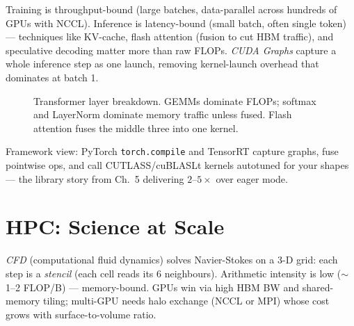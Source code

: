 Training is throughput-bound (large batches, data-parallel across hundreds of GPUs with NCCL). Inference is latency-bound (small batch, often single token) --- techniques like KV-cache, flash attention (fusion to cut HBM traffic), and speculative decoding matter more than raw FLOPs. \emph{CUDA Graphs} capture a whole inference step as one launch, removing kernel-launch overhead that dominates at batch 1.

\begin{figure}[h]\centering
{}
\caption{Transformer layer breakdown. GEMMs dominate FLOPs; softmax and LayerNorm dominate memory traffic unless fused. Flash attention fuses the middle three into one kernel.}
\label{fig:transformer}
\end{figure}

Framework view: PyTorch \texttt{torch.compile} and TensorRT capture graphs, fuse pointwise ops, and call CUTLASS/cuBLASLt kernels autotuned for your shapes --- the library story from Ch.~5 delivering $2$--$5\times$ over eager mode.

\section{HPC: Science at Scale}
\emph{CFD} (computational fluid dynamics) solves Navier-Stokes on a 3-D grid: each step is a \emph{stencil} (each cell reads its 6 neighbours). Arithmetic intensity is low ($\sim$1--2 FLOP/B) --- memory-bound. GPUs win via high HBM BW and shared-memory tiling; multi-GPU needs halo exchange (NCCL or MPI) whose cost grows with surface-to-volume ratio.


